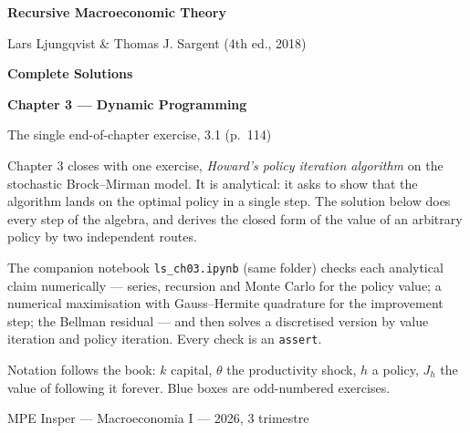 \documentclass[12pt, letterpaper]{article}
\begin{document}
\begin{titlepage}
\centering
\vspace*{2.5cm}
{\Huge\bfseries\color{darkblue} Recursive Macroeconomic Theory\par}
\vspace{6pt}
{\large Lars Ljungqvist \& Thomas J. Sargent (4th ed., 2018)\par}
\vspace{1.4cm}
{\LARGE\bfseries Complete Solutions\par}
\vspace{6pt}
{\LARGE\bfseries Chapter 3 --- Dynamic Programming\par}
\vspace{1.2cm}
{\large The single end-of-chapter exercise, 3.1 (p.~114)\par}
\vspace{2cm}

\begin{tcolorbox}[theorybox,title={What is in this file},width=0.86\textwidth]
\small
Chapter 3 closes with one exercise, \emph{Howard's policy iteration algorithm} on the
stochastic Brock--Mirman model. It is analytical: it asks to show that the algorithm lands on
the optimal policy in a single step. The solution below does every step of the algebra, and
derives the closed form of the value of an arbitrary policy by two independent routes.

\smallskip
The companion notebook \texttt{ls\_ch03.ipynb} (same folder) checks each analytical claim
numerically --- series, recursion and Monte Carlo for the policy value; a numerical
maximisation with Gauss--Hermite quadrature for the improvement step; the Bellman residual ---
and then solves a discretised version by value iteration and policy iteration. Every check is
an \texttt{assert}.

\smallskip
Notation follows the book: $k$ capital, $\theta$ the productivity shock, $h$ a policy,
$J_h$ the value of following it forever. Blue boxes are odd-numbered exercises.
\end{tcolorbox}

\vfill
{\small MPE Insper --- Macroeconomia I --- 2026, 3\textordmasculine{} trimestre\par}
\end{titlepage}

\tableofcontents
\newpage
\end{document}
